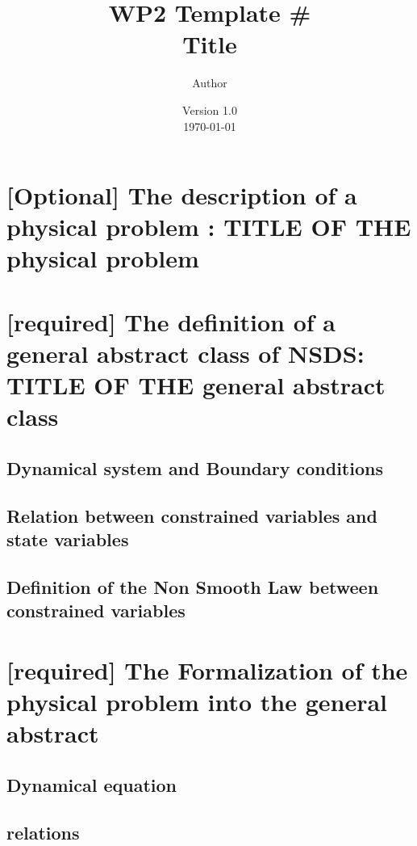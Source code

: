 \documentclass[10pt]{article}
\begin{document}
\thispagestyle{empty}
\title{WP2 Template \# \\
 Title}
\author{Author}

\date{Version 1.0 \\
 \today}
\maketitle


\pagestyle{fancy}

\section{[Optional] The description of a physical problem : TITLE OF THE physical problem}



\section{[required] The definition of a general abstract class of NSDS: TITLE OF THE general abstract class}

\subsection{Dynamical system and Boundary conditions}


\subsection{Relation between constrained variables and state variables}


\subsection{Definition of the Non Smooth Law between constrained variables}

 
\section{[required] The Formalization of the physical problem into the general abstract}

\subsection{Dynamical equation}


\subsection{relations}
\end{document}
